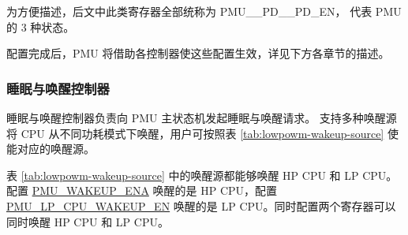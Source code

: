 \documentclass[main\_\_CN.tex]{subfiles}
\begin{document}
\begin{tiplisting}
为方便描述，后文中此类寄存器全部统称为 PMU\_\_PD\_\_PD\_EN， 代表 PMU 的 3 种状态。
\end{tiplisting}

配置完成后，PMU 将借助各控制器使这些配置生效，详见下方各章节的描述。

\subsubsection{睡眠与唤醒控制器}

睡眠与唤醒控制器负责向 PMU 主状态机发起睡眠与唤醒请求。\chipname{} 支持多种唤醒源将 CPU 从不同功耗模式下唤醒，用户可按照表 \ref{tab:lowpowm-wakeup-source} 使能对应的唤醒源。

表 \ref{tab:lowpowm-wakeup-source} 中的唤醒源都能够唤醒 HP CPU 和 LP CPU。配置 \hyperref[fielddesc:PMUWAKEUPENA]{PMU\_WAKEUP\_ENA} 唤醒的是 HP CPU，配置 \hyperref[fielddesc:PMULPCPUWAKEUPEN]{PMU\_LP\_CPU\_WAKEUP\_EN} 唤醒的是 LP CPU。同时配置两个寄存器可以同时唤醒 HP CPU 和 LP CPU。
\end{document}
